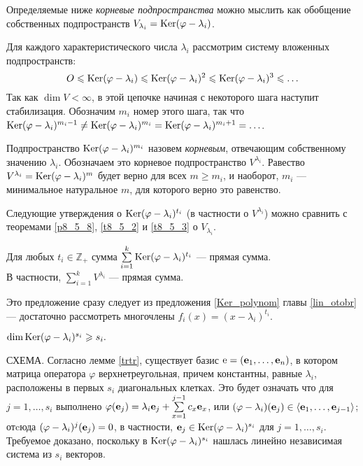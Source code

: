 Определяемые ниже {\it корневые подпространства} можно мыслить как обобщение собственных 
подпространств $V_{\lambda_i} = \mathop{\rm Ker}\nolimits (\varphi - \lambda_i)$.

Для каждого характеристического числа $\lambda_i$
рассмотрим систему вложенных подпространств:
\begin{equation}\label{Ker^}
O\leqslant  \mathop{\rm Ker}\nolimits (\varphi - \lambda_i)\leqslant \mathop{\rm Ker}\nolimits (\varphi - \lambda_i)^2 \leqslant 
\mathop{\rm Ker}\nolimits (\varphi - \lambda_i)^3\leqslant \ldots  
\end{equation}
Так как $\dim V<\infty$, в этой цепочке начиная с некоторого шага наступит стабилизация.
Обозначим $m_i$ номер этого шага, так что 
$\Ker (\varphi - \lambda_i)^{m_{i}-1} %
\neq \Ker (\varphi - \lambda_i)^{m_{i}} = \Ker (\varphi - \lambda_i)^{m_{i}+1} = \ldots$.

Подпространство $\mathop{\rm Ker}\nolimits (\varphi - \lambda_i)^{m_{i}} $ назовем
{\it корневым}, отвечающим собственному значению $\lambda_i$.
Обозначаем это корневое подпространство 
$V^{\lambda_i}$.
Равество $V^{\lambda_i} = \mathop{\rm Ker}\nolimits (\varphi - \lambda_i)^{m} $ будет верно для 
всех $m\geq m_i$, и наоборот, $m_i$ --- минимальное натуральное $m$, 
для которого верно это равенство.



Следующие утверждения о $\mathop{\rm Ker}\nolimits (\varphi - \lambda_i)^{t_i}$ (в частности о $V^{\lambda _i}$) 
можно сравнить с теоремами \ref{p8_5_8}, \ref{t8_5_2} и \ref{t8_5_3}
о $V_{\lambda _i}$.

\begin{lemm}\label{p8_5_88888}
Для любых  $t_i\in \mathbb{Z}_{+}$ сумма 
$\sum\limits_{i=1}^{k} \mathop{\rm Ker}\nolimits (\varphi - \lambda_i)^{t_i} $ --- прямая сумма.\\
В частности, $\sum\limits_{i=1}^{k} V^{\lambda _i} $ --- прямая сумма.
\end{lemm}
\dok Это предложение сразу следует из предложения \ref{Ker_polynom} главы
\ref{lin_otobr} --- достаточно рассмотреть многочлены $f_i(x) = (x- \lambda _i)^{t_i}$.
\edok

\begin{lemm}\label{Kers_i}
$\mathop{\rm dim}\nolimits \mathop{\rm Ker}\nolimits (\varphi - \lambda_i)^{s_i} \geqslant s_i.$
\end{lemm}
\dok
СХЕМА. 
Согласно лемме \ref{trtr}, существует базис
$\mathrm{e} = (\mathbf{e}_1, \ldots, \mathbf{e}_n)$, в котором матрица оператора $\varphi$ верхнетреугольная, 
причем константны, равные $\lambda_i$, расположены в первых 
$s_i$ диагональных клетках. Это будет означать что для $j=1, \ldots, s_i$ 
выполнено $\varphi (\mathbf{e}_j)=  \lambda_i \mathbf{e}_j + \sum\limits_{x=1}^{j-1} c_x \mathbf{e}_x$, 
или $(\varphi - \lambda_i)(\mathbf{e}_j ) \in \langle \mathbf{e}_1,\ldots , \mathbf{e}_{j-1}  \rangle$;
отcюда $(\varphi - \lambda_i)^j(\mathbf{e}_j )=0$, в частности, 
$\mathbf{e}_j \in \mathop{\rm Ker}\nolimits (\varphi - \lambda_i)^{s_i}$ для $j=1, \ldots, s_i$.
Требуемое доказано, поскольку в $\mathop{\rm Ker}\nolimits (\varphi - \lambda_i)^{s_i} $ нашлась линейно независимая система 
из $s_i$ векторов.
\edok

